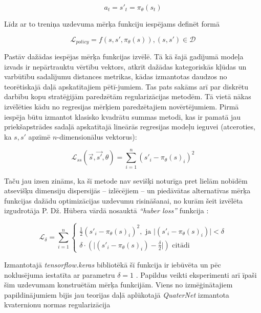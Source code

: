 \documentclass[12pt, a4paper]{article}
\numberwithin{equation}{section} %
\begin{document}
\begin{equation}
    a_t = s'_t = \pi_{\theta}(s_t)
\end{equation}

Līdz ar to treniņa uzdevuma mērķa funkciju iespējams definēt formā

\begin{equation}
    \mathcal{L}_{policy} = f \left (s,s',\pi_{\theta}(s) \right ), (s,s') \in \mathcal{D}
\end{equation}

Pastāv dažādas iespējas mērķa funkcijas izvēlē. Tā kā šajā gadījumā modeļa izvads ir nepārtrauktu vērtību vektors, atkrīt dažādas kategoriskās kļūdas un varbūtību sadalījumu distances metrikas, kādas izmantotas daudzos no teorētiskajā daļā apskatītajiem pētī-jumiem. Tas pats sakāms arī par diskrētu darbību kopu stratēģijām paredzētām regularizācijas metodēm. Tā vietā nākas izvēlēties kādu no regresijas mērķiem paredzētajiem novērtējumiem. Pirmā iespēja būtu izmantot klasisko kvadrātu summas metodi, kas ir pamatā jau priekšapstrādes sadaļā apskatītajā lineārās regresijas modeļu ieguvei (atceroties, ka $s, s'$ apzīmē $n$-dimensionālus vektorus):


\begin{equation}
    \mathcal{L}_{ss} (\vec{s},\vec{s'},\theta) = \sum_{i=1}^n (s'_i - \pi_{\theta}(s)_i)^2 
\end{equation}

Taču jau izsen zināms, ka šī metode nav sevišķi noturīga pret lielām nobīdēm atsevišķu dimensiju dispersijās -- izlēcējiem -- un piedāvātas alternatīvas mērķa funkcijas dažādu optimizācijas uzdevumu risināšanai, no kurām šeit izvēlēta izgudrotāja P. Dž. Hūbera vārdā nosauktā \textit{``huber loss''} funkcija \cite{huber_loss}:


\begin{equation}
    \mathcal{L}_{\delta} =  \sum_{i=1}^n 
    \begin{cases}
    \frac{1}{2} (s'_i - \pi_{\theta}(s)_i)^2, \text{ ja } \vert (s'_i - \pi_{\theta}(s)_i) \vert < \delta \\
    \delta \cdot \left (  \vert (s'_i - \pi_{\theta}(s)_i) - \frac{\delta}{2} \vert  \right ) \text{ citādi}
    \end{cases}
\end{equation}


Izmantotajā \textit{tensorflow.keras} bibliotēkā šī funkcija ir iebūvēta un pēc noklusējuma iestatīta ar parametru $\delta = 1$ \cite{keras_huber}. Papildus veikti eksperimenti arī īpaši šim uzdevumam konstruētām mērķa funkcijām. Viens no izmēģinātajiem papildinājumiem bijis jau teorijas daļā aplūkotajā \textit{QuaterNet} izmantota kvaternionu normas regularizācija \cite{pavllo2018quaternet}
\end{document}
